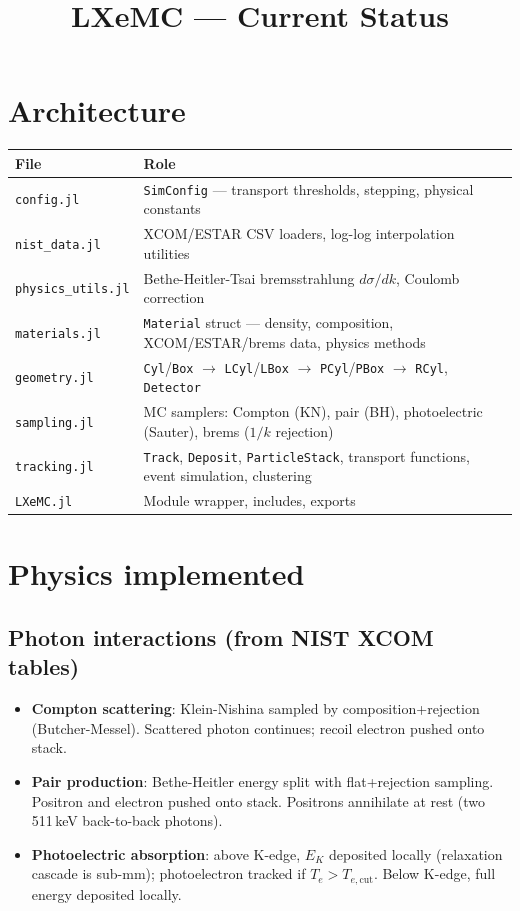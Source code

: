 \documentclass{article}
\title{LXeMC --- Current Status}
\author{}
\date{}
\begin{document}
\maketitle

\section{Architecture}

\begin{table}[h]
\centering
\begin{tabular}{@{}ll@{}}
\toprule
File & Role \\
\midrule
\texttt{config.jl}        & \texttt{SimConfig} --- transport thresholds, stepping, physical constants \\
\texttt{nist\_data.jl}     & XCOM/ESTAR CSV loaders, log-log interpolation utilities \\
\texttt{physics\_utils.jl} & Bethe-Heitler-Tsai bremsstrahlung $d\sigma/dk$, Coulomb correction \\
\texttt{materials.jl}      & \texttt{Material} struct --- density, composition, XCOM/ESTAR/brems data, physics methods \\
\texttt{geometry.jl}       & \texttt{Cyl}/\texttt{Box} $\to$ \texttt{LCyl}/\texttt{LBox} $\to$ \texttt{PCyl}/\texttt{PBox} $\to$ \texttt{RCyl}, \texttt{Detector} \\
\texttt{sampling.jl}       & MC samplers: Compton (KN), pair (BH), photoelectric (Sauter), brems ($1/k$ rejection) \\
\texttt{tracking.jl}       & \texttt{Track}, \texttt{Deposit}, \texttt{ParticleStack}, transport functions, event simulation, clustering \\
\texttt{LXeMC.jl}          & Module wrapper, includes, exports \\
\bottomrule
\end{tabular}
\end{table}

\section{Physics implemented}

\subsection{Photon interactions (from NIST XCOM tables)}

\begin{itemize}
  \item \textbf{Compton scattering}: Klein-Nishina sampled by composition+rejection (Butcher-Messel). Scattered photon continues; recoil electron pushed onto stack.
  \item \textbf{Pair production}: Bethe-Heitler energy split with flat+rejection sampling. Positron and electron pushed onto stack. Positrons annihilate at rest (two 511\,keV back-to-back photons).
  \item \textbf{Photoelectric absorption}: above K-edge, $E_K$ deposited locally (relaxation cascade is sub-mm); photoelectron tracked if $T_e > T_{e,\mathrm{cut}}$. Below K-edge, full energy deposited locally.
\end{itemize}
\end{document}
